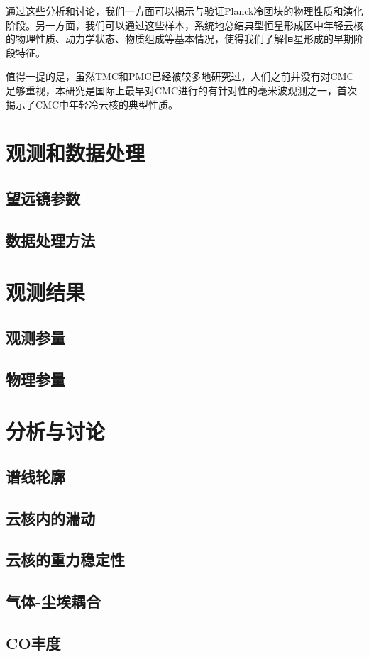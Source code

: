 \documentclass[UTF8]{pkuthss}
\begin{document}
		通过这些分析和讨论，我们一方面可以揭示与验证Planck冷团块的物理性质和演化阶段。另一方面，我们可以通过这些样本，系统地总结典型恒星形成区中年轻云核的物理性质、动力学状态、物质组成等基本情况，使得我们了解恒星形成的早期阶段特征。

		值得一提的是，虽然TMC和PMC已经被较多地研究过，人们之前并没有对CMC足够重视，本研究是国际上最早对CMC进行的有针对性的毫米波观测之一，首次揭示了CMC中年轻冷云核的典型性质。

\chapter{观测和数据处理}
	\section{望远镜参数}
	\section{数据处理方法}
\chapter{观测结果}
	\section{观测参量}
	\section{物理参量}
\chapter{分析与讨论}
	\section{谱线轮廓}
	\section{云核内的湍动}
	\section{云核的重力稳定性}
	\section{气体-尘埃耦合}
	\section{CO丰度}
\end{document}
